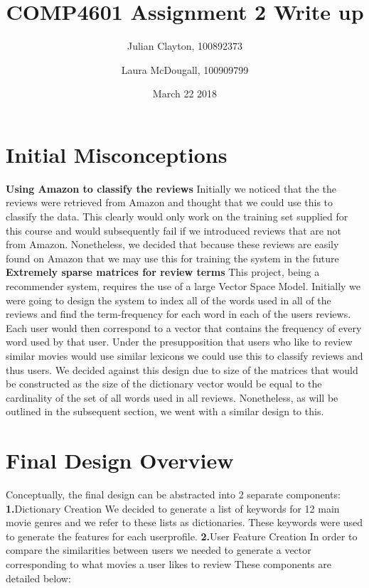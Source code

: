 \documentclass{article}
\title{COMP4601 Assignment 2 Write up}
\author{Julian Clayton, 100892373 \and  Laura McDougall, 100909799}
\date{March 22 2018}
\begin{document}
\maketitle

\section{Initial Misconceptions}
\textbf{Using Amazon to classify the reviews}\newline
Initially we noticed that the the reviews were retrieved from Amazon and thought that we could use this to classify the data. This clearly would only work on the training set supplied for this course and would subsequently fail if we introduced reviews that are not from Amazon. Nonetheless, we decided that because these reviews are easily found on Amazon that  we may use this for training the system in the future \newline\newline
\textbf{Extremely sparse matrices for review terms}\newline
This project, being a recommender system, requires the use of a large Vector Space Model. Initially we were going to design the system to index all of the words used in all of the reviews and find the term-frequency for each word in each of the users reviews.  Each user would then correspond to a vector that contains the frequency of every word used by that user. Under the presupposition that users who like to review similar movies would use similar lexicons we could use this to classify reviews and thus users. We decided against this design due to size of the matrices that would be constructed as the size of the dictionary vector would be equal to the cardinality of the set of all words used in all reviews. Nonetheless, as will be outlined in the subsequent section, we went with a similar design to this. 
\section{Final Design Overview}
Conceptually, the final  design can be abstracted into 2 separate components: \newline\newline
\textbf{1.}\space Dictionary Creation\newline
We decided to generate a list of keywords for 12 main movie genres and we refer to these lists as dictionaries. These keywords were used to generate the features for each userprofile.\newline 
\textbf{2.}\space User Feature Creation\newline
In order to compare the similarities between users we needed to generate a vector corresponding to what movies a user likes to review \newline\newline
These components are detailed below:
\end{document}
